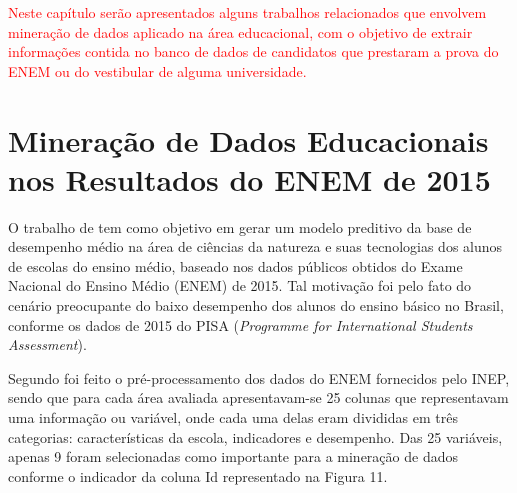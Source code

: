 \label{chapter:correlatos}

\par
\textcolor{red}{Neste capítulo serão apresentados alguns trabalhos relacionados que envolvem mineração de dados aplicado na área educacional, com o objetivo de extrair informações contida no banco de dados de candidatos que prestaram a prova do ENEM ou do vestibular de alguma universidade.} 

\section{Mineração de Dados Educacionais nos Resultados do ENEM de 2015}

\par
O trabalho de  tem como objetivo em gerar um modelo preditivo da base de desempenho médio na área de ciências da natureza e suas tecnologias dos alunos de escolas do ensino médio, baseado nos dados públicos obtidos do Exame Nacional do Ensino Médio (ENEM) de 2015. Tal motivação foi pelo fato do cenário preocupante do baixo desempenho dos alunos do ensino básico no Brasil, conforme os dados de 2015 do PISA (\textit{Programme for International Students Assessment}).

\par
Segundo  foi feito o pré-processamento dos dados do ENEM fornecidos pelo INEP, sendo que para cada área avaliada apresentavam-se 25 colunas que representavam uma informação ou variável, onde cada uma delas eram divididas em três categorias: características da escola, indicadores e desempenho. Das 25 variáveis, apenas 9 foram selecionadas como importante para a mineração de dados conforme o indicador da coluna Id representado na Figura 11. 

